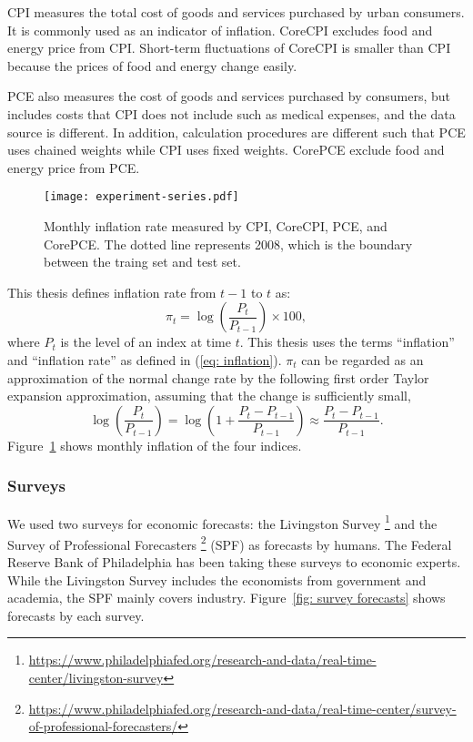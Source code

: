 \documentclass[../main.tex]{subfiles}
\begin{document}
CPI measures the total cost of goods and services purchased by urban consumers.
It is commonly used as an indicator of inflation.
CoreCPI excludes food and energy price from CPI\@.
Short-term fluctuations of CoreCPI is smaller than CPI because the prices of food and energy change easily.

PCE also measures the cost of goods and services purchased by consumers, but includes costs that CPI does not include such as medical expenses, and the data source is different.
In addition, calculation procedures are different such that PCE uses chained weights while CPI uses fixed weights.
CorePCE exclude food and energy price from PCE\@.

\begin{figure}
  \centering
  \texttt{[image: experiment-series.pdf]}
  \caption{
    Monthly inflation rate measured by CPI, CoreCPI, PCE, and CorePCE\@.
    The dotted line represents 2008, which is the boundary between the traing set and test set.
  }\label{fig: series}
\end{figure}

This thesis defines inflation rate from $t - 1$ to $t$ as:
\begin{equation}
  \pi_t = \log \left(\frac{P_t}{P_{t-1}}\right) \times 100,
  \label{eq: inflation}
\end{equation}
where $P_t$ is the level of an index at time $t$.
This thesis uses the terms ``inflation'' and ``inflation rate'' as defined in (\ref{eq: inflation}).
$\pi_t$ can be regarded as an approximation of the normal change rate by the following first order Taylor expansion approximation, assuming that the change is sufficiently small,
\begin{equation*}
  \log \left(\frac{P_t}{P_{t-1}}\right) = \log \left(1 + \frac{P_t - P_{t - 1}}{P_{t - 1}}\right) \approx \frac{P_t - P_{t - 1}}{P_{t - 1}}.
\end{equation*}
Figure~\ref{fig: series} shows monthly inflation of the four indices.

\subsubsection{Surveys}
\label{ssub: Surveys}

We used two surveys for economic forecasts: the Livingston Survey%
\footnote{\url{https://www.philadelphiafed.org/research-and-data/real-time-center/livingston-survey}} and the Survey of Professional Forecasters%
\footnote{\url{https://www.philadelphiafed.org/research-and-data/real-time-center/survey-of-professional-forecasters/}} (SPF) as forecasts by humans.
The Federal Reserve Bank of Philadelphia has been taking these surveys to economic experts.
While the Livingston Survey includes the economists from government and academia, the SPF mainly covers industry.
Figure~\ref{fig: survey forecasts} shows forecasts by each survey.
\end{document}
